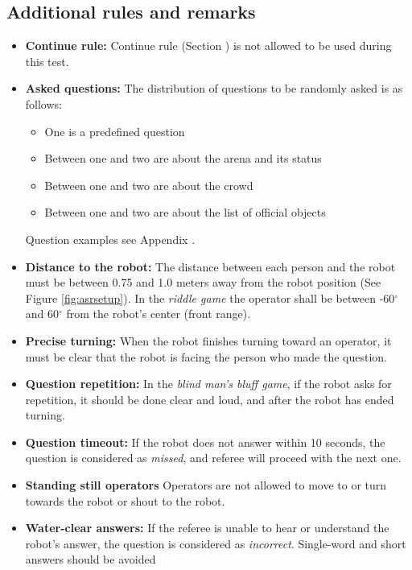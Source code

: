 \subsection{Additional rules and remarks}

\begin{itemize}
    \item \textbf{Continue rule:} Continue rule (Section ) is not allowed to be used during this test.
    \item \textbf{Asked questions:} The distribution of questions to be randomly asked is as follows:
    \begin{itemize}
        \item One is a predefined question
        \item Between one and two are about the arena and its status
        \item Between one and two are about the crowd
        \item Between one and two are about the list of official objects
    \end{itemize}
    Question examples see Appendix .
    \item \textbf{Distance to the robot:} The distance between each person and the robot must be between 0.75 and 1.0 meters away from the robot position (See Figure \ref{fig:asrsetup}). In the \textit{riddle game} the operator shall be between -60$^{\circ}$ and 60$^{\circ}$ from the robot's center (front range).
    \item \textbf{Precise turning:} When the robot finishes turning toward an operator, it must be clear that the robot is facing the person who made the question.
    \item \textbf{Question repetition:} In the \textit{blind man's bluff game}, if the robot asks for repetition, it should be done clear and loud, and after the robot has ended turning.
    \item \textbf{Question timeout:} If the robot does not answer within 10 seconds, the question is considered as \textit{missed}, and referee will proceed with the next one.
    \item \textbf{Standing still operators} Operators are not allowed to move to or turn towards the robot or shout to the robot.
    \item \textbf{Water-clear answers:} If the referee is unable to hear or understand the robot's answer, the question is considered as \textit{incorrect}. Single-word and short answers should be avoided
\end{itemize}

